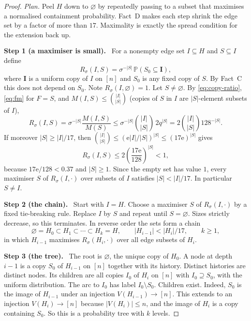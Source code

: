 \documentclass[11pt]{article}
\numberwithin{equation}{section}
\newcommand{\PP}{\mathbb P}
\newcommand{\ee}{\mathrm e}
\newcommand{\step}[2]{\medskip\noindent\textbf{Step #1 (#2).}\ }
\begin{document}
\begin{proof}
\emph{Plan.} Peel $H$ down to $\varnothing$ by repeatedly passing to a
subset that maximises a normalised containment probability. Fact~D
makes each step shrink the edge set by a factor of more than $17$.
Maximality is exactly the spread condition for the extension back up.

\step{1}{a maximiser is small}
For a nonempty edge set $I\subseteq H$ and $S\subseteq I$ define
\begin{equation}\label{eq:maximizer}
 R_\sigma(I,S)=\sigma^{-|S|}\,\PP(S_0\subseteq\boldsymbol I),
\end{equation}
where $\boldsymbol I$ is a uniform copy of $I$ on $[n]$ and $S_0$ is
any fixed copy of $S$. By Fact~C this does not depend on $S_0$. Note
$R_\sigma(I,\varnothing)=1$. Let $S\ne\varnothing$. By
\eqref{eq:copy-ratio}, \eqref{eq:fm} for $F=S$, and
$M(I,S)\le\binom{|I|}{|S|}$ (copies of $S$ in $I$ are $|S|$-element
subsets of $I$),
\[
 R_\sigma(I,S)=\sigma^{-|S|}\frac{M(I,S)}{M(S)}
 \le\sigma^{-|S|}\binom{|I|}{|S|}\,2q^{|S|}
 =2\binom{|I|}{|S|}128^{-|S|}.
\]
If moreover $|S|\ge|I|/17$, then
$\binom{|I|}{|S|}\le(\ee|I|/|S|)^{|S|}\le(17\ee)^{|S|}$ gives
\begin{equation}\label{eq:small}
 R_\sigma(I,S)\le2\left(\frac{17\ee}{128}\right)^{|S|}<1 ,
\end{equation}
because $17\ee/128<0.37$ and $|S|\ge1$. Since the empty set has value
$1$, every maximiser $S$ of $R_\sigma(I,\cdot)$ over subsets of $I$
satisfies $|S|<|I|/17$. In particular $S\ne I$.

\step{2}{the chain}
Start with $I=H$. Choose a maximiser $S$ of $R_\sigma(I,\cdot)$ by a
fixed tie-breaking rule. Replace $I$ by $S$ and repeat until
$S=\varnothing$. Sizes strictly decrease, so this terminates. In
reverse order the sets form a chain
\[
 \varnothing=H_0\subset H_1\subset\cdots\subset H_k=H,
 \qquad |H_{i-1}|<|H_i|/17,\qquad k\ge1,
\]
in which $H_{i-1}$ maximises $R_\sigma(H_i,\cdot)$ over all edge
subsets of $H_i$.

\step{3}{the tree}
The root is $\varnothing$, the unique copy of $H_0$. A node at depth
$i-1$ is a copy $S_0$ of $H_{i-1}$ on $[n]$ together with its history.
Distinct histories are distinct nodes. Its children are all copies
$I_0$ of $H_i$ on $[n]$ with $I_0\supseteq S_0$, with the uniform
distribution. The arc to $I_0$ has label $I_0\setminus S_0$. Children
exist. Indeed, $S_0$ is the image of $H_{i-1}$ under an injection
$V(H_{i-1})\to[n]$. This extends to an injection $V(H_i)\to[n]$
because $|V(H_i)|\le n$, and the image of $H_i$ is a copy containing
$S_0$. So this is a probability tree with $k$ levels.


\end{proof}
\end{document}
